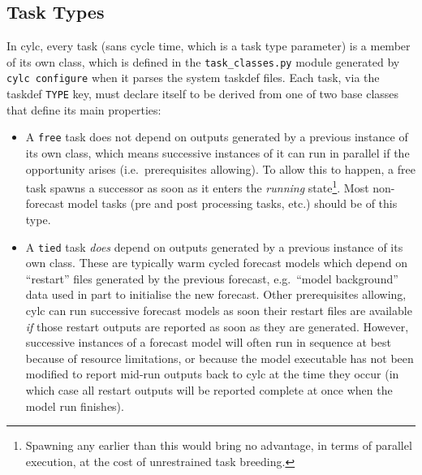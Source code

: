 \documentclass[11pt,a4paper]{article}
\begin{document}
\subsection{Task Types} 
\label{TaskTypes}

In cylc, every task (sans cycle time, which is a task type parameter) is
a member of its own class, which is defined in the \lstinline=task_classes.py=
module generated by \lstinline=cylc configure= when it parses the system
taskdef files.  Each task, via the taskdef \lstinline=TYPE= key, must
declare itself to be derived from one of two base classes that define
its main properties:

\begin{itemize} 
    
    \item A \lstinline=free= task does not depend on outputs generated
        by a previous instance of its own class, which means successive
        instances of it can run in parallel if the opportunity arises
        (i.e.\ prerequisites allowing).  To allow this to happen, a free
        task spawns a successor as soon as it enters the {\em running}
        state\footnote{Spawning any earlier than this would bring no
        advantage, in terms of parallel execution, at the cost of
        unrestrained task breeding.}. Most non-forecast model tasks (pre
        and post processing tasks, etc.) should be of this type.

    \item A \lstinline=tied= task {\em does} depend on outputs generated
        by a previous instance of its own class. These are typically
        warm cycled forecast models which depend on ``restart'' files
        generated by the previous forecast, e.g.\ ``model background''
        data used in part to initialise the new forecast.
        Other prerequisites allowing, cylc can run successive forecast
        models as soon their restart files are available {\em if}
        those restart outputs are reported as soon as they are
        generated. However, successive instances of a forecast model will
        often run in sequence at best because of resource limitations,
        or because the model executable has not been modified to report
        mid-run outputs back to cylc at the time they occur (in which
        case all restart outputs will be reported complete at once when
        the model run finishes).


\end{itemize}
\end{document}
